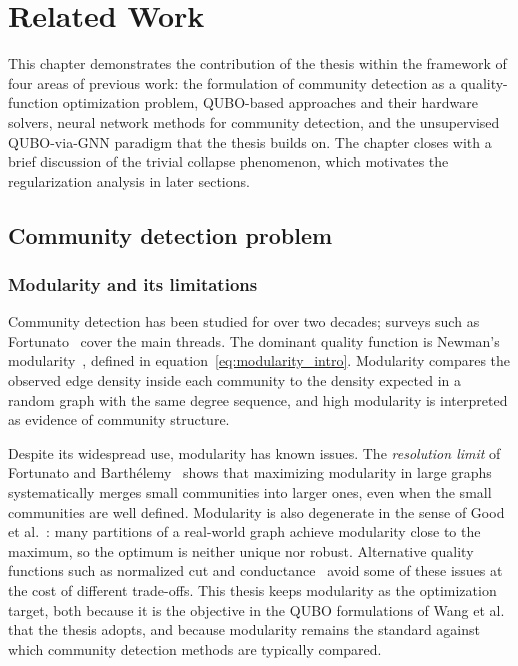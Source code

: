 
\section{Related Work}
\label{sec:related_work}

This chapter demonstrates the contribution of the thesis within the framework of four
areas of previous work: the formulation of community detection as a
quality-function optimization problem, QUBO-based approaches and
their hardware solvers, neural network methods for community
detection, and the unsupervised QUBO-via-GNN paradigm that the
thesis builds on. The chapter closes with a brief discussion of the
trivial collapse phenomenon, which motivates the regularization
analysis in later sections.

\subsection{Community detection problem}
\label{sec:rw_problem}

\subsubsection{Modularity and its limitations}
\label{sec:rw_modularity}

Community detection has been studied for over two decades; surveys
such as Fortunato~\cite{fortunato2010community} cover the main
threads. The dominant quality function is Newman's
modularity~\cite{newman2006modularity}, defined in
equation~\eqref{eq:modularity_intro}. Modularity compares the
observed edge density inside each community to the density expected
in a random graph with the same degree sequence, and high modularity
is interpreted as evidence of community structure.

Despite its widespread use, modularity has known issues. The
\emph{resolution limit} of Fortunato and
Barth\'elemy~\cite{fortunato2007resolution} shows that maximizing
modularity in large graphs systematically merges small communities
into larger ones, even when the small communities are well defined.
Modularity is also degenerate in the sense of Good et
al.~\cite{good2010performance}: many partitions of a real-world
graph achieve modularity close to the maximum, so the optimum is
neither unique nor robust. Alternative quality functions such as
normalized cut and conductance~\cite{shi2000normalized} avoid some
of these issues at the cost of different trade-offs. This thesis
keeps modularity as the optimization target, both because it is the
objective in the QUBO formulations of Wang et
al.~\cite{wang2024quantum} that the thesis adopts, and because
modularity remains the standard against which community detection
methods are typically compared.

